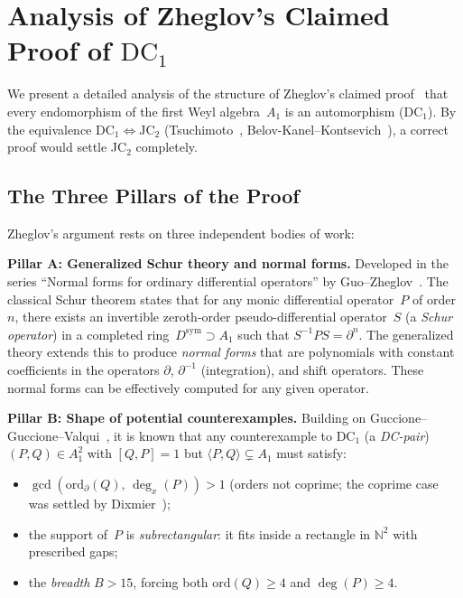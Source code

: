 \documentclass[12pt,a4paper]{article}
\theoremstyle{definition}
\begin{document}
\section{Analysis of Zheglov's Claimed Proof of $\mathrm{DC}_1$}
\label{sec:zheglov-analysis}

We present a detailed analysis of the structure of Zheglov's claimed
proof~\cite{Zheglov2024} that every endomorphism of the first Weyl
algebra~$A_1$ is an automorphism ($\mathrm{DC}_1$).  By the equivalence
$\mathrm{DC}_1 \iff \mathrm{JC}_2$ (Tsuchimoto~\cite{Tsuchimoto},
Belov-Kanel--Kontsevich~\cite{BKK}), a correct proof would settle
JC$_2$ completely.

\subsection{The Three Pillars of the Proof}

Zheglov's argument rests on three independent bodies of work:

\medskip\noindent
\textbf{Pillar A: Generalized Schur theory and normal forms.}
Developed in the series ``Normal forms for ordinary differential
operators'' by Guo--Zheglov~\cite{GuoZheglov1, GuoZheglov2,
GuoZheglov3}.  The classical Schur theorem states that for any monic
differential operator~$P$ of order~$n$, there exists an invertible
zeroth-order pseudo-differential operator~$S$ (a \emph{Schur
operator}) in a completed ring~$D^{\mathrm{sym}} \supset A_1$ such
that $S^{-1} P S = \partial^n$.  The generalized theory extends this
to produce \emph{normal forms} that are polynomials with constant
coefficients in the operators $\partial$, $\partial^{-1}$
(integration), and shift operators.  These normal forms can be
effectively computed for any given operator.

\medskip\noindent
\textbf{Pillar B: Shape of potential counterexamples.}  Building on
Guccione--Guccione--Valqui~\cite{GGV}, it is known that any
counterexample to DC$_1$ (a \emph{DC-pair}) $(P, Q) \in A_1^2$ with
$[Q, P] = 1$ but $\langle P, Q \rangle \subsetneq A_1$ must satisfy:
\begin{itemize}
\item $\gcd(\mathrm{ord}_\partial(Q),\, \deg_x(P)) > 1$ (orders not
  coprime; the coprime case was settled by Dixmier~\cite{Dixmier1968});
\item the support of~$P$ is \emph{subrectangular}: it fits inside a
  rectangle in $\mathbb{N}^2$ with prescribed gaps;
\item the \emph{breadth} $B > 15$, forcing both $\mathrm{ord}(Q) \geq
  4$ and $\deg(P) \geq 4$.
\end{itemize}
\end{document}
